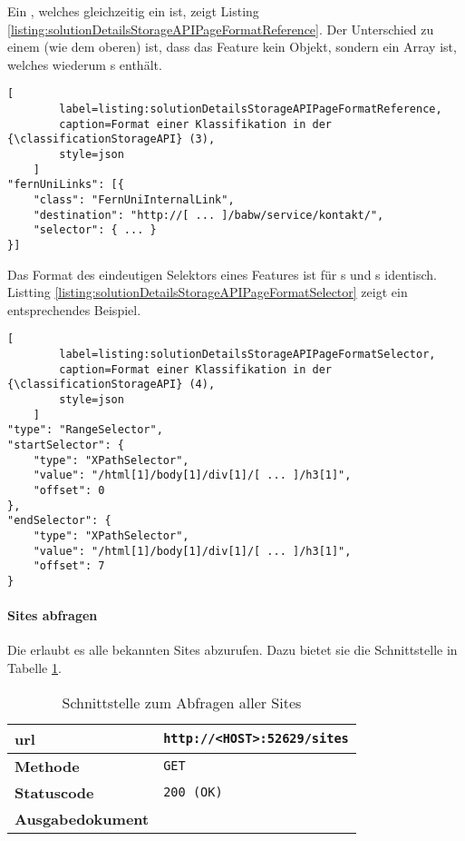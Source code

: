     Ein {}, welches gleichzeitig ein {\collectionFeature} ist,
    zeigt Listing \ref{listing:solutionDetailsStorageAPIPageFormatReference}.
    Der Unterschied zu einem {\scalarFeature} (wie dem oberen) ist,
    dass das Feature kein Objekt, sondern ein Array ist,
    welches wiederum {\scalarFeature}s enthält.

    \begin{lstlisting}[
        label=listing:solutionDetailsStorageAPIPageFormatReference,
        caption=Format einer Klassifikation in der {\classificationStorageAPI} (3),
        style=json
    ]
"fernUniLinks": [{
    "class": "FernUniInternalLink",
    "destination": "http://[ ... ]/babw/service/kontakt/",
    "selector": { ... }
}]
    \end{lstlisting}

    Das Format des eindeutigen Selektors eines Features ist für {\contentFeature}s
    und {}s identisch.
    Listting \ref{listing:solutionDetailsStorageAPIPageFormatSelector} zeigt ein entsprechendes Beispiel.

    \begin{lstlisting}[
        label=listing:solutionDetailsStorageAPIPageFormatSelector,
        caption=Format einer Klassifikation in der {\classificationStorageAPI} (4),
        style=json
    ]
"type": "RangeSelector",
"startSelector": {
    "type": "XPathSelector",
    "value": "/html[1]/body[1]/div[1]/[ ... ]/h3[1]",
    "offset": 0
},
"endSelector": {
    "type": "XPathSelector",
    "value": "/html[1]/body[1]/div[1]/[ ... ]/h3[1]",
    "offset": 7
}
    \end{lstlisting}

    \paragraph{Sites abfragen}
    Die {\classificationStorageAPI} erlaubt es alle bekannten Sites abzurufen.
    Dazu bietet sie die Schnittstelle in Tabelle \ref{table:getSitesInterface}.

    \begin{table}[htb]
        \centering
        \begin{tabular}{|l|l|}
        \hline
        \textbf{\gls{url}} & \texttt{http://<HOST>:52629/sites}\\
        \hline
        \textbf{Methode} & \texttt{GET}\\
        \hline
        \textbf{Statuscode} & \texttt{200 (OK)}\\
        \hline
        \textbf{Ausgabedokument} & \\
        \hline
        \end{tabular}
        \caption{Schnittstelle zum Abfragen aller Sites}
        \label{table:getSitesInterface}
    \end{table}

